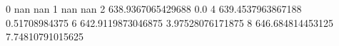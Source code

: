 0 nan nan
1 nan nan
2 638.9367065429688 0.0
4 639.4537963867188 0.51708984375
6 642.9119873046875 3.97528076171875
8 646.684814453125 7.74810791015625
